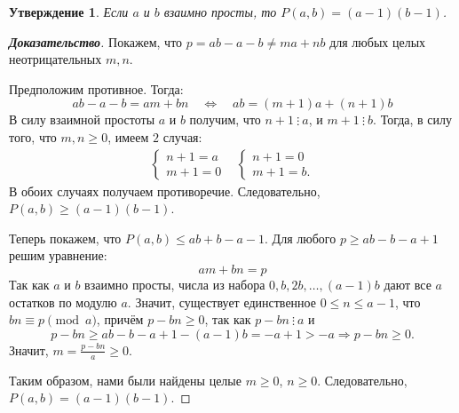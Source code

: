 \documentclass[12pt]{article}
\newtheorem{proposition}[theorem]{Утверждение}
\begin{document}
\begin{proposition}
Если $a$ и $b$ взаимно просты, то $P(a, b) = (a - 1)(b - 1)$.
\end{proposition}
\begin{proof}[\textbf{Доказательство}]
Покажем, что $p = ab - a - b \ne ma + nb$ для любых целых неотрицательных $m, n$.

Предположим противное. Тогда: \begin{equation*}
 ab - a - b = am + bn \quad \Longleftrightarrow \quad ab = (m + 1)a + (n + 1) b
\end{equation*}
В силу взаимной простоты $a$ и $b$ получим, что $n + 1 \ \vdots \ a$, и $m + 1 \ \vdots \ b$. Тогда, в силу того, что $m, n \ge 0$, имеем $2$ случая:\begin{align*}
     \begin{cases}
        n + 1 = a\\
        m + 1 = 0
    \end{cases}
    &
    \begin{cases}
        n + 1 = 0\\
        m + 1 = b.
    \end{cases}
\end{align*}
В обоих случаях получаем противоречие. Следовательно, $P(a, b) \ge (a - 1)(b - 1)$.

Теперь покажем, что $P(a, b) \le ab + b - a - 1$. Для любого $p \ge ab - b - a + 1$ решим уравнение: \begin{equation*}
am + bn = p
\end{equation*}
Так как $a$ и $b$ взаимно просты, числа из набора $0, b, 2b, \dots, (a - 1)b$ дают все $a$ остатков по модулю $a$. Значит, существует единственное $0 \le n \le a - 1$, что $bn \equiv p \pmod a$, причём $p - bn \ge 0$, так как $p - bn \ \vdots \ a$ и
\begin{equation*}
p - bn \ge ab - b - a + 1 - (a - 1)b = -a + 1 > -a \Longrightarrow p - bn \ge 0.
\end{equation*}
Значит, $m = \frac{p - bn}{a} \ge 0$.

Таким образом, нами были найдены целые $m \ge 0$, $n \ge 0$. Следовательно, $P(a, b) = (a - 1)(b - 1)$.
\end{proof}
\end{document}
